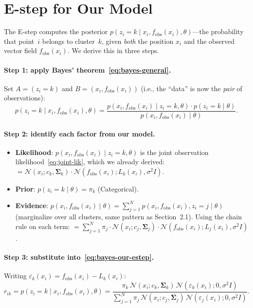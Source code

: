 \documentclass[11pt]{article}
\theoremstyle{definition}
\theoremstyle{plain}
\theoremstyle{remark}
\newcommand{\Sv}{\boldsymbol{\Sigma}}
\begin{document}
\section{E-step for Our Model}

The E-step computes the posterior $p(z_i=k\mid x_i,f_{\mathrm{obs}}(x_i),\theta)$---the probability that point~$i$ belongs to cluster~$k$, given \emph{both} the position $x_i$ and the observed vector field $f_{\mathrm{obs}}(x_i)$. We derive this in three steps.

\paragraph{Step 1: apply Bayes' theorem~\eqref{eq:bayes-general}.} Set $A=(z_i=k)$ and $B=(x_i,f_{\mathrm{obs}}(x_i))$ (i.e., the ``data'' is now the \emph{pair} of observations):
\begin{equation}
  p(z_i=k\mid x_i,f_{\mathrm{obs}}(x_i),\theta) = \frac{p(x_i,f_{\mathrm{obs}}(x_i)\mid z_i=k,\theta)\cdot p(z_i=k\mid\theta)}{p(x_i,f_{\mathrm{obs}}(x_i)\mid\theta)}.
  \label{eq:bayes-our-estep}
\end{equation}

\paragraph{Step 2: identify each factor from our model.}
\begin{itemize}[leftmargin=*,itemsep=2pt]
  \item \textbf{Likelihood}: $p(x_i,f_{\mathrm{obs}}(x_i)\mid z_i=k,\theta)$ is the joint observation likelihood~\eqref{eq:joint-lik}, which we already derived:
  $= \mathcal{N}(x_i;c_k,\Sv_k)\cdot\mathcal{N}(f_{\mathrm{obs}}(x_i);L_k(x_i),\sigma^2 I)$.
  \item \textbf{Prior}: $p(z_i=k\mid\theta)=\pi_k$ \quad (Categorical).
  \item \textbf{Evidence}: $p(x_i,f_{\mathrm{obs}}(x_i)\mid\theta)=\sum_{j=1}^N p(x_i,f_{\mathrm{obs}}(x_i),z_i=j\mid\theta)$ (marginalize over all clusters, same pattern as Section~2.1). Using the chain rule on each term:
  $= \sum_{j=1}^N \pi_j\cdot\mathcal{N}(x_i;c_j,\Sv_j)\cdot\mathcal{N}(f_{\mathrm{obs}}(x_i);L_j(x_i),\sigma^2 I)$.
\end{itemize}

\paragraph{Step 3: substitute into~\eqref{eq:bayes-our-estep}.} Writing $\varepsilon_k(x_i)=f_{\mathrm{obs}}(x_i)-L_k(x_i)$:
\begin{equation}
  r_{ik} = p(z_i=k\mid x_i,f_{\mathrm{obs}}(x_i),\theta) = \frac{\pi_k\,\mathcal{N}(x_i;c_k,\Sv_k)\,\mathcal{N}(\varepsilon_k(x_i);0,\sigma^2 I)}{\sum_{j=1}^N\pi_j\,\mathcal{N}(x_i;c_j,\Sv_j)\,\mathcal{N}(\varepsilon_j(x_i);0,\sigma^2 I)}.
  \label{eq:estep-ours}
\end{equation}
\end{document}
